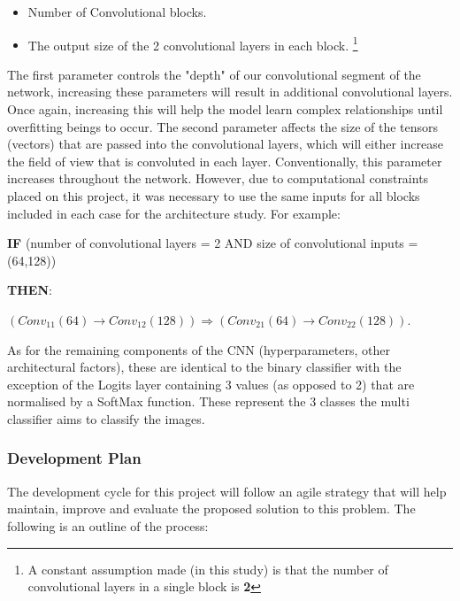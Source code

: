 \documentclass[a4paper]{article}
\begin{document}
            \begin{itemize}
                \item Number of Convolutional blocks.
                \item The output size of the 2 convolutional layers in each block. \footnote{A constant assumption made (in this study) is that the number of convolutional layers in a single block is \textbf{2}}
            \end{itemize}
            \vspace{3mm}

            The first parameter controls the "depth" of our convolutional segment of the network, increasing these parameters will result in additional convolutional layers. Once again, increasing this will help the model learn complex relationships until overfitting beings to occur. The second parameter affects the size of the tensors (vectors) that are passed into the convolutional layers, which will either increase the field of view that is convoluted in each layer. Conventionally, this parameter increases throughout the network. However, due to computational constraints placed on this project, it was necessary to use the same inputs for all blocks included in each case for the architecture study. For example:
            \vspace{3mm}
            
            \textbf{IF} (number of convolutional layers = 2 {AND} size of convolutional inputs = (64,128)) 

            \vspace{3mm} 

            \textbf{THEN}:

            \begin{center}
                $(Conv_{11}(64) \rightarrow Conv_{12}(128)) \Rightarrow (Conv_{21}(64) \rightarrow Conv_{22}(128))$.
            \end{center}

            As for the remaining components of the CNN (hyperparameters, other architectural factors), these are identical to the binary classifier with the exception of the Logits layer containing 3 values (as opposed to 2) that are normalised by a SoftMax function. These represent the 3 classes the multi classifier aims to classify the images.  

        \newpage
        \subsubsection{Development Plan}
        The development cycle for this project will follow an agile strategy that will help maintain, improve and evaluate the proposed solution to this problem. The following is an outline of the process:
    
\end{document}
